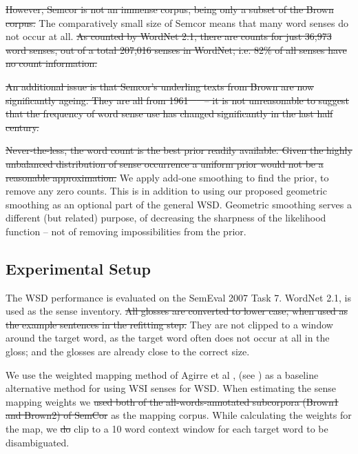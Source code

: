 \documentclass{article} %
\def\parencite{\cite} %
\providecommand{\DIFadd}[1]{{\protect\color{blue}\uwave{#1}}} %
\providecommand{\DIFdel}[1]{{\protect\color{red}\sout{#1}}}                      %
\providecommand{\DIFaddbegin}{} %
\providecommand{\DIFaddend}{} %
\providecommand{\DIFdelbegin}{} %
\providecommand{\DIFdelend}{} %
\begin{document}
\DIFdel{However, Semcor is not an immense corpus, being only a subset of the Brown corpus. }\DIFdelend The comparatively small size of Semcor means that many word senses do not occur at all.
\DIFdelbegin \DIFdel{As counted by WordNet 2.1, there are counts for just  36,973 word senses, out of a total 207,016 senses in WordNet; i.e. 82\% of all senses have no count information.
}%

\DIFdel{An additional issue is that Semcor's underling texts from Brown are now significantly ageing. They are all from 1961 \mbox{%
\cite{francis1979brown} }%
-- it is not unreasonable to suggest that the frequency of word sense use has changed significantly in the last half century.
}%

\DIFdel{Never-the-less, the word count is the best prior readily available. Given the highly unbalanced distribution of sense occurrence a uniform prior would not be a reasonable approximation.
}\DIFdelend We apply add-one smoothing to find the prior, to remove any zero counts.
This is in addition to using our proposed geometric smoothing as an optional part of the general WSD.
Geometric smoothing serves a different (but related) purpose, of decreasing the sharpness of the likelihood function -- not of removing impossibilities from the prior.

\subsection {Experimental Setup}
The WSD performance is evaluated on the SemEval 2007 Task 7. 
WordNet 2.1, is used as the sense inventory.
\DIFdelbegin \DIFdel{All glosses are converted to lower case, when used as the example sentences in the refitting step. 
}\DIFdelend They are not clipped to a window around the target word, as the target word often does not occur at all in the gloss; and the glosses are already close to the correct size.

We use the weighted mapping method of Agirre et al \DIFdelbegin %
\DIFdelend \DIFaddbegin {}\DIFaddend , (see ) as a baseline alternative method for using WSI senses for WSD.
When estimating the sense mapping weights we \DIFdelbegin \DIFdel{used both of the all-words-annotated subcorpora (Brown1 and Brown2) of SemCor }\DIFdelend \DIFaddbegin \DIFadd{use Semcor }\DIFaddend as the mapping corpus.
While calculating the weights for the map, we \DIFdelbegin \DIFdel{do }\DIFdelend clip to a 10 word context window for each target word to be disambiguated.
\end{document}
